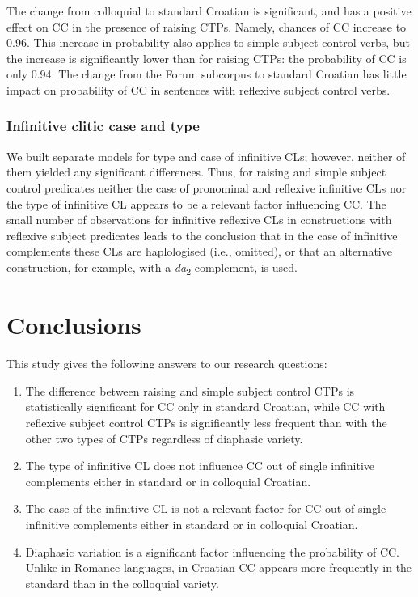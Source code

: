 The change from colloquial to standard Croatian is significant, and has a positive effect on CC in the presence of raising CTPs. Namely, chances of CC increase to 0.96. This increase in probability also applies to simple subject control verbs, but the increase is significantly lower than for raising CTPs: the probability of CC is only 0.94. The change from the Forum subcorpus to standard Croatian has little impact on probability of CC in sentences with reflexive subject control verbs.

\subsubsection{Infinitive clitic case and type}
We built separate models for type and case of infinitive CLs; however, neither of them yielded any significant differences. Thus, for raising and simple subject control predicates neither the case of pronominal and reflexive infinitive CLs nor the type of infinitive CL appears to be a relevant factor influencing CC. The small number of observations for infinitive reflexive CLs in constructions with reflexive subject predicates leads to the conclusion that in the case of infinitive complements these CLs are haplologised (i.e., omitted), or that an alternative construction, for example, with a \textit{da}\textsubscript{2}-complement, is used.

\section{Conclusions}
\label{Conclusions:inf}
This study gives the following answers to our research questions: 

\begin{enumerate}[label=A\arabic*:]
\item The difference between raising and simple subject control CTPs is statistically significant for CC only in standard Croatian, while CC with reflexive subject control CTPs is significantly less frequent than with the other two types of CTPs regardless of diaphasic variety. 

\item The type of infinitive CL does not influence CC out of single infinitive complements either in standard or in colloquial Croatian.

\item The case of the infinitive CL is not a relevant factor for CC out of single infinitive complements either in standard or in colloquial Croatian.

\item Diaphasic variation is a significant factor influencing the probability of CC. Unlike in Romance languages, in Croatian CC appears more frequently in the standard than in the colloquial variety. 
\end{enumerate}


